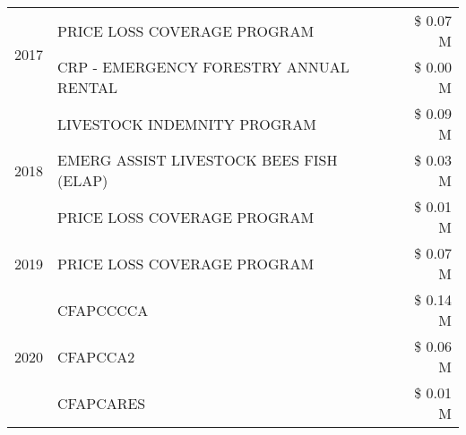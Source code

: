\begin{tabular}{llr}
\cline{1-3}
\multirow[t]{2}{*}{2017} & PRICE LOSS COVERAGE PROGRAM & \$ 0.07 M \\
 & CRP - EMERGENCY FORESTRY ANNUAL RENTAL & \$ 0.00 M \\
\cline{1-3}
\multirow[t]{3}{*}{2018} & LIVESTOCK INDEMNITY PROGRAM & \$ 0.09 M \\
 & EMERG ASSIST LIVESTOCK BEES FISH (ELAP) & \$ 0.03 M \\
 & PRICE LOSS COVERAGE PROGRAM & \$ 0.01 M \\
\cline{1-3}
2019 & PRICE LOSS COVERAGE PROGRAM & \$ 0.07 M \\
\cline{1-3}
\multirow[t]{3}{*}{2020} & CFAPCCCCA & \$ 0.14 M \\
 & CFAPCCA2 & \$ 0.06 M \\
 & CFAPCARES & \$ 0.01 M \\
\cline{1-3}
\bottomrule
\end{tabular}
